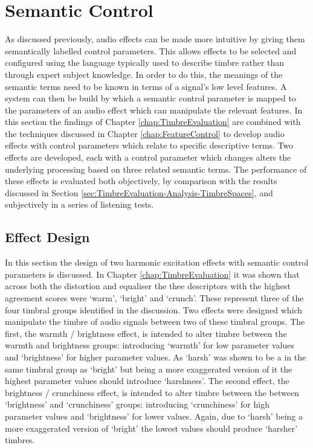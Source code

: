 \section{Semantic Control}
\label{sec:PerceptualExperiments-SemanticControl}
	As discussed previously, audio effects can be made more intuitive by giving them semantically labelled control
	parameters. This allows effects to be selected and configured using the language typically used to describe timbre
	rather than through expert subject knowledge. In order to do this, the meanings of the semantic terms need to be
	known in terms of a signal's low level features. A system can then be build by which a semantic control parameter
	is mapped to the parameters of an audio effect which can manipulate the relevant features. In this section the
	findings of Chapter \ref{chap:TimbreEvaluation} are combined with the techniques discussed in Chapter
	\ref{chap:FeatureControl} to develop audio effects with control parameters which relate to specific descriptive
	terms. Two effects are developed, each with a control parameter which changes alters the underlying processing
	based on three related semantic terms. The performance of these effects is evaluated both objectively, by
	comparison with the results discussed in Section \ref{sec:TimbreEvaluation-Analysis-TimbreSpaces}, and subjectively
	in a series of listening tests.

	\subsection{Effect Design}
	\label{sec:PerceptualExperiments-SemanticControl-EffectDesign}
		In this section the design of two harmonic excitation effects with semantic control parameters is
		discussed. In Chapter \ref{chap:TimbreEvaluation} it was shown that across both the distortion and
		equaliser the thee descriptors with the highest agreement scores were `warm', `bright' and `crunch'. These
		represent three of the four timbral groups identified in the discussion. Two effects were designed which
		manipulate the timbre of audio signals between two of these timbral groups. The first, the warmth /
		brightness effect, is intended to alter timbre between the warmth and brightness groups: introducing
		`warmth' for low parameter values and `brightness' for higher parameter values. As `harsh' was shown to be
		a in the same timbral group as `bright' but being a more exaggerated version of it the highest parameter
		values should introduce `harshness'. The second effect, the brightness / crunchiness effect, is intended to
		alter timbre between the between `brightness' and `crunchiness' groups: introducing `crunchiness' for high
		parameter values and `brightness' for lower values. Again, due to `harsh' being a more exaggerated version
		of `bright' the lowest values should produce `harsher' timbres.

